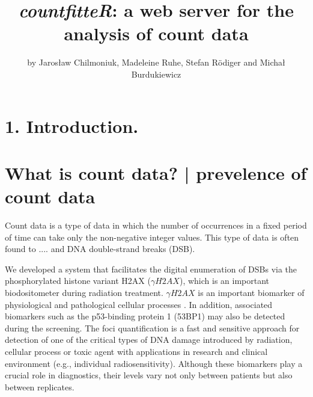 \title{\emph{countfitteR}: a web server for the analysis of count data}
\author{by Jaros\l{}aw Chilmoniuk, Madeleine Ruhe, Stefan R\"{o}diger and Micha\l{} Burdukiewicz}

\maketitle


\section{1. Introduction.}
\section{What is count data? | prevelence of count data}
Count data is a type of data in which the number of occurrences in a fixed period of time can take only the non-negative integer values.
This type of data is often found to .... and DNA double-strand breaks (DSB).

We developed a system that facilitates the digital  enumeration of DSBs via the phosphorylated histone  variant H2AX ($\gamma H2AX$), which is an important  biodositometer during radiation treatment. $\gamma H2AX$ is an important biomarker of physiological and pathological cellular processes \cite{reddig_dna_2018,rodiger_quantification_2018}. In addition, associated biomarkers such as the p53-binding protein 1 (53BP1) may also be detected during the screening. The foci quantification is a fast and sensitive approach for detection of one of the critical types of DNA damage introduced by radiation, cellular process or toxic agent with applications in research and clinical environment (e.g., individual radiosensitivity). Although these biomarkers play a crucial role in diagnostics, their levels vary not only between patients but also between replicates.

